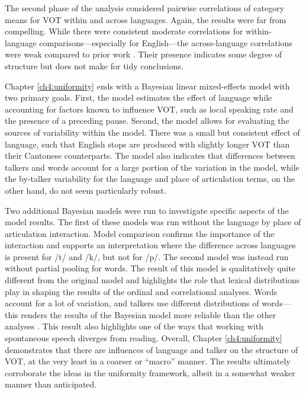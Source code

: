 The second phase of the analysis considered pairwise correlations of category means for VOT within and across languages. Again, the results were far from compelling. While there were consistent moderate correlations for within-language comparisons---especially for English---the across-language correlations were weak compared to prior work \citep{chodroff_2017_structure, chodroff_2019_l2}. Their presence indicates some degree of structure but does not make for tidy conclusions. 

Chapter \ref{ch4:uniformity} ends with a Bayesian linear mixed-effects model with two primary goals. First, the model estimates the effect of language while accounting for factors known to influence VOT, such as local speaking rate and the presence of a preceding pause. Second, the model allows for evaluating the sources of variability within the model. There was a small but consistent effect of language, such that English stops are produced with slightly longer VOT than their Cantonese counterparts. The model also indicates that differences between talkers and words account for a large portion of the variation in the model, while the by-talker variability for the language and place of articulation terms, on the other hand, do not seem particularly robust. 

Two additional Bayesian models were run to investigate specific aspects of the model results. The first of these models was run without the language by place of articulation interaction. Model comparison confirms the importance of the interaction and supports an interpretation where the difference across languages is present for /t/ and /k/, but not for /p/. The second model was instead run without partial pooling for words. The result of this model is qualitatively quite different from the original model and highlights the role that lexical distributions play in shaping the results of the ordinal and correlational analyses. Words account for a lot of variation, and talkers use different distributions of words---this renders the results of the Bayesian model more reliable than the other analyses \citep[see][]{haines_2020_theoretically}. This result also highlights one of the ways that working with spontaneous speech diverges from reading. Overall, Chapter \ref{ch4:uniformity} demonstrates that there are influences of language and talker on the structure of VOT, at the very least in a coarser or ``macro'' manner. The results ultimately corroborate the ideas in the uniformity framework, albeit in a somewhat weaker manner than anticipated. 

